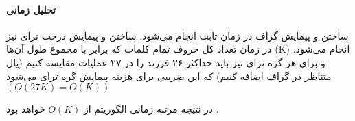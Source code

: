    \paragraph{تحلیل زمانی}
   ساختن و پیمایش گراف در زمان ثابت انجام می‌شود.
    ساختن و پیمایش درخت ترای نیز در زمان
    تعداد کل حروف تمام کلمات
    که برابر با مجموع طول آن‌ها 
    (K) 
    انجام می‌شود.
    و برای هر گره ترای نیز باید 
    حداکثر
    ۲۶ 
    فرزند را 
    در ۲۷ 
    عملیات مقایسه کنیم 
    (یال متناظر در گراف اضافه کنیم)
    که این ضریبی برای هزینه پیمایش گره ترای می‌شود
    $(O(27K) = O(K))$

    در نتیجه مرتبه زمانی الگوریتم از 
    $O(K)$
    خواهد بود
    .



